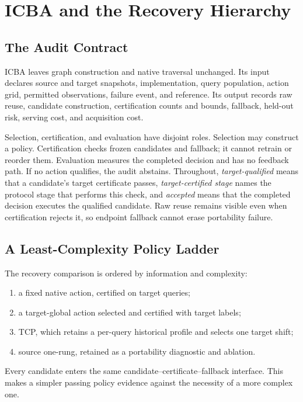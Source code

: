 \section{ICBA and the Recovery Hierarchy}
\label{sec:auditor}

\subsection{The Audit Contract}
ICBA leaves graph construction and native traversal unchanged. Its input declares source and target snapshots, implementation, query population, action grid, permitted observations, failure event, and reference. Its output records raw reuse, candidate construction, certification counts and bounds, fallback, held-out risk, serving cost, and acquisition cost.

Selection, certification, and evaluation have disjoint roles. Selection may construct a policy. Certification checks frozen candidates and fallback; it cannot retrain or reorder them. Evaluation measures the completed decision and has no feedback path. If no action qualifies, the audit abstains. Throughout, \emph{target-qualified} means that a candidate's target certificate passes, \emph{target-certified stage} names the protocol stage that performs this check, and \emph{accepted} means that the completed decision executes the qualified candidate. Raw reuse remains visible even when certification rejects it, so endpoint fallback cannot erase portability failure.

\subsection{A Least-Complexity Policy Ladder}
The recovery comparison is ordered by information and complexity:
\begin{enumerate}
\item a fixed native action, certified on target queries;
\item a target-global action selected and certified with target labels;
\item TCP, which retains a per-query historical profile and selects one target shift;
\item source one-rung, retained as a portability diagnostic and ablation.
\end{enumerate}
Every candidate enters the same candidate--certificate--fallback interface. This makes a simpler passing policy evidence against the necessity of a more complex one.

